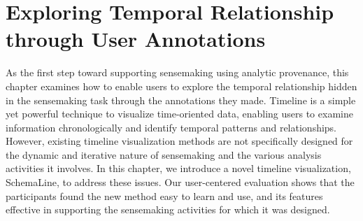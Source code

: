 \chapter{Exploring Temporal Relationship through User Annotations}
\label{chap:schemaline}

\graphicspath{{Chapter3/figures/}}
As the first step toward supporting sensemaking using analytic provenance, this chapter examines how to enable users to explore the temporal relationship hidden in the sensemaking task through the annotations they made. Timeline is a simple yet powerful technique to visualize time-oriented data, enabling users to examine information chronologically and identify temporal patterns and relationships. However, existing timeline visualization methods are not specifically designed for the dynamic and iterative nature of sensemaking and the various analysis activities it involves. In this chapter, we introduce a novel timeline visualization, SchemaLine, to address these issues. Our user-centered evaluation shows that the participants found the new method easy to learn and use, and its features effective in supporting the sensemaking activities for which it was designed.

